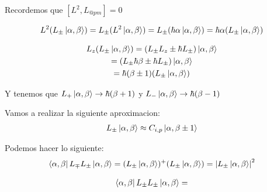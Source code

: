 \documentclass{article}
\begin{document}
Recordemos que $ [L^2, L _{@pm } ] =0 $ 

\begin{gather*}
  L^2 (L_\pm  \ket{\alpha,\beta}) = L_\pm  (L^2 \ket{\alpha,\beta}) = L_\pm (\hbar \alpha \ket{\alpha,\beta}) = \hbar \alpha (L_\pm \ket{\alpha,\beta}) 
\end{gather*}

\hfill 

\begin{gather*}
  L_z (L_\pm \ket{\alpha,\beta}) = (L_\pm L_z \pm \hbar L_\pm ) \ket{\alpha,\beta} \\
  = (L_\pm \hbar \beta \pm \hbar L_\pm  ) \ket{\alpha, \beta}\\
  = \hbar (\beta \pm 1 )(L_\pm \ket{\alpha, \beta})
\end{gather*}

Y tenemos que $ L_+ \ket{\alpha, \beta} \rightarrow \hbar (\beta + 1 ) $ y $ L_- \ket{\alpha,\beta} \rightarrow \hbar (\beta-1 ) $

Vamos a realizar la siguiente aproximacion: 
\begin{gather*}
  L_\pm \ket{\alpha,\beta} \approx C _{i,p } \ket{\alpha,\beta\pm 1} 
\end{gather*}

Podemos hacer lo siguiente: 
\begin{gather*}
  \bra{\alpha,\beta} L_\mp L_\pm \ket{\alpha,\beta} = (L_\pm \ket{\alpha,\beta})^+ (L_\pm \ket{\alpha,\beta}) = \left|L_\pm \ket{\alpha,\beta}\right|^2 
\end{gather*}


\begin{gather*}
  \bra{\alpha,\beta} L _{\pm }  L _{\pm } \ket{\alpha, \beta} =  
\end{gather*}
\end{document}
